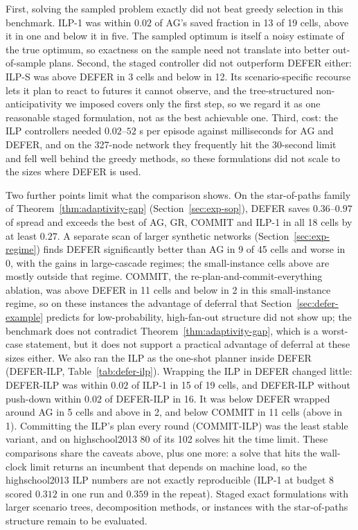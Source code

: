 \documentclass[preprint,11pt]{elsarticle}
\theoremstyle{definition}
\theoremstyle{remark}
\begin{document}
First, solving the sampled problem exactly did not beat greedy selection in
this benchmark. ILP-1 was within $0.02$ of AG's saved fraction in 13
of 19 cells, above it in one and below it in five. The sampled optimum is itself a noisy
estimate of the true optimum, so exactness on the sample need not translate
into better out-of-sample plans. Second, the staged controller did not
outperform DEFER either: ILP-S was above DEFER in 3 cells and
below in 12. Its scenario-specific recourse lets it plan to react to futures it
cannot observe, and the tree-structured non-anticipativity we imposed covers
only the first step, so we regard it as one reasonable staged formulation, not
as the best achievable one. Third, cost: the ILP controllers needed
$0.02$--$52$ s per episode against milliseconds for AG and DEFER, and on the
327-node network they frequently hit the 30-second limit and fell well behind
the greedy methods, so these formulations did not scale to the sizes where
DEFER is used.

Two further points limit what the comparison shows. On the star-of-paths family
of Theorem~\ref{thm:adaptivity-gap} (Section~\ref{sec:exp-sop}), DEFER
saves $0.36$--$0.97$ of spread and exceeds the best of AG, GR, COMMIT and
ILP-1 in all 18 cells by at least $0.27$. A separate scan of larger
synthetic networks (Section~\ref{sec:exp-regime}) finds DEFER significantly
better than AG in 9 of 45 cells and worse in 0, with the gains in large-cascade regimes; the
small-instance cells above are mostly outside that regime. COMMIT, the
re-plan-and-commit-everything ablation, was above DEFER in 11 cells and below
in 2 in this small-instance regime, so on these instances the advantage of
deferral that Section~\ref{sec:defer-example} predicts for low-probability,
high-fan-out structure did not show up; the benchmark does not contradict
Theorem~\ref{thm:adaptivity-gap}, which is a worst-case statement, but it
does not support a practical advantage of deferral at these sizes either. We
also ran the ILP as the one-shot planner inside DEFER
(DEFER-ILP, Table~\ref{tab:defer-ilp}). Wrapping the
ILP in DEFER changed little: DEFER-ILP was within $0.02$ of
ILP-1 in 15 of 19 cells, and DEFER-ILP without push-down
within $0.02$ of DEFER-ILP in 16. It was below DEFER wrapped around AG in 5
cells and above in 2, and below COMMIT in 11 cells (above in 1). Committing the
ILP's plan every round (COMMIT-ILP) was the least stable variant,
and on highschool2013 80 of its 102 solves hit the time limit. These
comparisons share the caveats above, plus one more: a solve that hits the
wall-clock limit returns an incumbent that depends on machine load, so the
highschool2013 ILP numbers are not exactly reproducible (ILP-1 at
budget $8$ scored $0.312$ in one run and $0.359$ in the repeat). Staged exact formulations with larger scenario trees, decomposition methods, or
instances with the star-of-paths structure remain to be evaluated.
\end{document}
